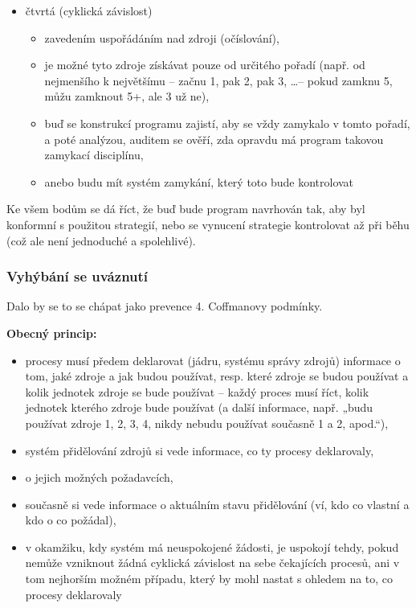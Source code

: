 \documentclass[a4paper, 11pt]{article}
\begin{document}
\begin{itemize}
    \item čtvrtá (cyklická závislost)
    \begin{itemize}
        \item zavedením uspořádáním nad zdroji (očíslování),
        \item je možné tyto zdroje získávat pouze od určitého pořadí (např. od nejmenšího k největšímu -- začnu 1, pak 2, pak 3, \ldots -- pokud zamknu 5, můžu zamknout 5+, ale 3 už ne), 
        \item buď se konstrukcí programu zajistí, aby se vždy zamykalo v tomto pořadí, a poté analýzou, auditem se ověří, zda opravdu má program takovou zamykací disciplínu,
        \item anebo budu mít systém zamykání, který toto bude kontrolovat
    \end{itemize}
\end{itemize}

Ke všem bodům se dá říct, že buď bude program navrhován tak, aby byl konformní s použitou strategií, nebo se vynucení strategie kontrolovat až při běhu (což ale není jednoduché a spolehlivé).

\subsubsection{Vyhýbání se uváznutí}
Dalo by se to se chápat jako prevence 4. Coffmanovy podmínky. 

\textbf{Obecný princip:}
\begin{itemize}
    \item procesy musí předem deklarovat (jádru, systému správy zdrojů) informace o tom, jaké zdroje a jak budou používat, resp. které zdroje se budou používat a kolik jednotek zdroje se bude používat -- každý proces musí říct, kolik jednotek kterého zdroje bude používat (a další informace, např. „budu používat zdroje 1, 2, 3, 4, nikdy nebudu používat současně 1 a 2, apod.“),
    \item systém přidělování zdrojů si vede informace, co ty procesy deklarovaly,
    \item o jejich možných požadavcích,
    \item současně si vede informace o aktuálním stavu přidělování (ví, kdo co vlastní a kdo o co požádal),
    \item v okamžiku, kdy systém má neuspokojené žádosti, je uspokojí tehdy, pokud nemůže vzniknout žádná cyklická závislost na sebe čekajících procesů, ani v tom nejhorším možném případu, který by mohl nastat s ohledem na to, co procesy deklarovaly
\end{itemize}
 
\end{document}
